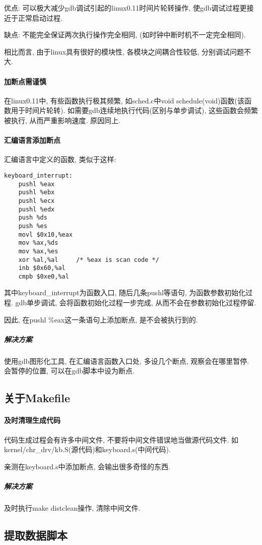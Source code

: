 \documentclass{ctexart}
\begin{document}
优点: 可以极大减少gdb调试引起的linux0.11时间片轮转操作, 使gdb调试过程更接近于正常启动过程.

缺点: 不能完全保证两次执行操作完全相同, (如时钟中断时机不一定完全相同).

相比而言, 由于linux具有很好的模块性, 各模块之间耦合性较低, 分别调试问题不大.

\paragraph{加断点需谨慎}

在linux0.11中, 有些函数执行极其频繁, 如sched.c中void schedule(void)函数(该函数用于时间片轮转). 如需要gdb连续地执行代码(区别与单步调试), 这些函数会频繁被执行, 从而严重影响速度. 原因同上.

\paragraph{汇编语言添加断点}
汇编语言中定义的函数, 类似于这样:
\begin{lstlisting}
keyboard_interrupt:
	pushl %eax
	pushl %ebx
	pushl %ecx
	pushl %edx
	push %ds
	push %es
	movl $0x10,%eax
	mov %ax,%ds
	mov %ax,%es
	xor %al,%al		/* %eax is scan code */
	inb $0x60,%al
	cmpb $0xe0,%al
\end{lstlisting}
其中keyboard\_interrupt为函数入口, 随后几条pushl等语句, 为函数参数初始化过程. gdb单步调试, 会将函数初始化过程一步完成, 从而不会在参数初始化过程停留.

因此, 在pushl \%eax这一条语句上添加断点, 是不会被执行到的.

\subparagraph{解决方案}
使用gdb图形化工具, 在汇编语言函数入口处, 多设几个断点, 观察会在哪里暂停. 会暂停的位置, 可以在gdb脚本中设为断点.

\subsection{关于Makefile}
\paragraph{及时清理生成代码}
代码生成过程会有许多中间文件, 不要将中间文件错误地当做源代码文件. 如kernel/chr\_drv/kb.S(源代码)和keyboard.s(中间代码).

亲测在keyboard.s中添加断点, 会输出很多奇怪的东西.
\subparagraph{解决方案}
及时执行make distclean操作, 清除中间文件. 

\subsection{提取数据脚本}
\end{document}
